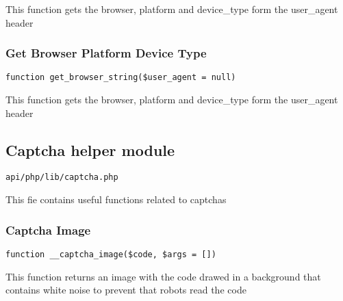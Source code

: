 \documentclass[a4paper]{article}
\begin{document}
This function gets the browser, platform and device\_type form the user\_agent header

\hypertarget{toc390}{}
\subsubsection{Get Browser Platform Device Type}

\begin{lstlisting}
function get_browser_string($user_agent = null)
\end{lstlisting}

This function gets the browser, platform and device\_type form the user\_agent header

\hypertarget{toc391}{}
\subsection{Captcha helper module}

\begin{lstlisting}
api/php/lib/captcha.php
\end{lstlisting}

This fie contains useful functions related to captchas

\hypertarget{toc392}{}
\subsubsection{Captcha Image}

\begin{lstlisting}
function __captcha_image($code, $args = [])
\end{lstlisting}

This function returns an image with the code drawed in a background that
contains white noise to prevent that robots read the code
\end{document}
